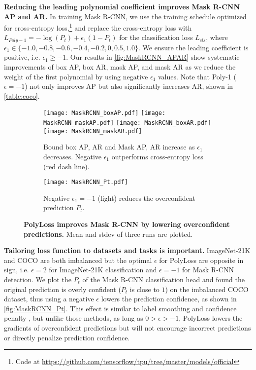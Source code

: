 \textbf{Reducing the leading polynomial coefficient improves Mask R-CNN AP and AR.}  In training Mask R-CNN, we use the training schedule optimized for cross-entropy loss,\footnote{\label{detection}Code at \url{https://github.com/tensorflow/tpu/tree/master/models/official}} and replace the cross-entropy loss with $L_{Poly-1}=-\log(P_t) + \epsilon_1 (1-P_t)$ for the classification loss $L_{cls}$, where $\epsilon_1 \in \{-1.0, -0.8, -0.6, -0.4, -0.2, 0, 0.5, 1.0 \}$. We ensure the leading coefficient is positive, i.e. $\epsilon_1\geq-1$. Our results in \autoref{fig:MaskRCNN_APAR} show systematic improvements of box AP, box AR, mask AP, and mask AR as we reduce the weight of the first polynomial by using negative $\epsilon_1$ values. Note that Poly-1 ($\epsilon=-1$) not only improves AP but also significantly increases AR, shown in \autoref{table:coco}. 
\begin{figure}[!h]
\vspace{-5pt}
  \centering
  \begin{subfigure}{0.6\textwidth}
  \centering
  \texttt{[image: MaskRCNN\_boxAP.pdf]}
  \texttt{[image: MaskRCNN\_maskAP.pdf]}
  \texttt{[image: MaskRCNN\_boxAR.pdf]}
  \texttt{[image: MaskRCNN\_maskAR.pdf]}
  \caption{Bound box AP, AR and Mask AP, AR increase as $\epsilon_1$ decreases. Negative $\epsilon_1$ outperforms cross-entropy loss (red dash line).}
  \label{fig:MaskRCNN_APAR}
  \end{subfigure}
  \quad
  \begin{subfigure}{0.35\textwidth}
  \texttt{[image: MaskRCNN\_Pt.pdf]}
  \caption{Negative $\epsilon_1=-1$ (light) reduces the overconfident prediction $P_t$.}
  \label{fig:MaskRCNN_Pt}
  \end{subfigure}
  \vspace{-5pt}
  \caption{\textbf{PolyLoss improves Mask R-CNN by lowering overconfident predictions.} Mean and stdev of three runs are plotted.}
  \vspace{-18pt}
\end{figure}

\textbf{Tailoring loss function to datasets and tasks is important.}  ImageNet-21K and COCO are both imbalanced but the optimal $\epsilon$ for PolyLoss are opposite in sign, i.e. $\epsilon =2$ for ImageNet-21K classification and $\epsilon =-1$ for Mask R-CNN detection. We plot the $P_t$ of the Mask R-CNN classification head and found the original prediction is overly confident ($P_t$ is close to $1$) on the imbalanced COCO dataset, thus using a negative $\epsilon$ lowers the prediction confidence, as shown in \autoref{fig:MaskRCNN_Pt}. This effect is similar to label smoothing \citep{szegedy2016rethinking} and confidence penalty \citep{pereyra2017regularizing}, but unlike those methods, as long as $0>\epsilon>-1$, PolyLoss lowers the gradients of overconfident predictions but will not encourage incorrect predictions or directly penalize prediction confidence. 
\vspace{-10pt}
